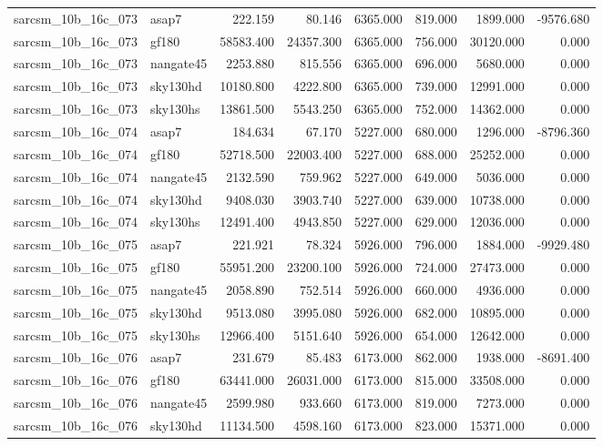 \begin{tabular}{llrrrrrr}
sarcsm\_10b\_16c\_073 & asap7 & 222.159 & 80.146 & 6365.000 & 819.000 & 1899.000 & -9576.680 \\
sarcsm\_10b\_16c\_073 & gf180 & 58583.400 & 24357.300 & 6365.000 & 756.000 & 30120.000 & 0.000 \\
sarcsm\_10b\_16c\_073 & nangate45 & 2253.880 & 815.556 & 6365.000 & 696.000 & 5680.000 & 0.000 \\
sarcsm\_10b\_16c\_073 & sky130hd & 10180.800 & 4222.800 & 6365.000 & 739.000 & 12991.000 & 0.000 \\
sarcsm\_10b\_16c\_073 & sky130hs & 13861.500 & 5543.250 & 6365.000 & 752.000 & 14362.000 & 0.000 \\
sarcsm\_10b\_16c\_074 & asap7 & 184.634 & 67.170 & 5227.000 & 680.000 & 1296.000 & -8796.360 \\
sarcsm\_10b\_16c\_074 & gf180 & 52718.500 & 22003.400 & 5227.000 & 688.000 & 25252.000 & 0.000 \\
sarcsm\_10b\_16c\_074 & nangate45 & 2132.590 & 759.962 & 5227.000 & 649.000 & 5036.000 & 0.000 \\
sarcsm\_10b\_16c\_074 & sky130hd & 9408.030 & 3903.740 & 5227.000 & 639.000 & 10738.000 & 0.000 \\
sarcsm\_10b\_16c\_074 & sky130hs & 12491.400 & 4943.850 & 5227.000 & 629.000 & 12036.000 & 0.000 \\
sarcsm\_10b\_16c\_075 & asap7 & 221.921 & 78.324 & 5926.000 & 796.000 & 1884.000 & -9929.480 \\
sarcsm\_10b\_16c\_075 & gf180 & 55951.200 & 23200.100 & 5926.000 & 724.000 & 27473.000 & 0.000 \\
sarcsm\_10b\_16c\_075 & nangate45 & 2058.890 & 752.514 & 5926.000 & 660.000 & 4936.000 & 0.000 \\
sarcsm\_10b\_16c\_075 & sky130hd & 9513.080 & 3995.080 & 5926.000 & 682.000 & 10895.000 & 0.000 \\
sarcsm\_10b\_16c\_075 & sky130hs & 12966.400 & 5151.640 & 5926.000 & 654.000 & 12642.000 & 0.000 \\
sarcsm\_10b\_16c\_076 & asap7 & 231.679 & 85.483 & 6173.000 & 862.000 & 1938.000 & -8691.400 \\
sarcsm\_10b\_16c\_076 & gf180 & 63441.000 & 26031.000 & 6173.000 & 815.000 & 33508.000 & 0.000 \\
sarcsm\_10b\_16c\_076 & nangate45 & 2599.980 & 933.660 & 6173.000 & 819.000 & 7273.000 & 0.000 \\
sarcsm\_10b\_16c\_076 & sky130hd & 11134.500 & 4598.160 & 6173.000 & 823.000 & 15371.000 & 0.000 \\

\end{tabular}
